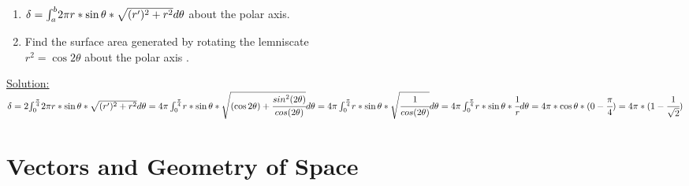 \noindent{\color{smalt(darkpowderblue)}\rule{\linewidth}{.2mm}}
\begin{example}
\begin{enumerate}
    \item $\delta={\Huge \int_{a}^{b}} {2\pi r*\sin{\theta}*\sqrt{(r')^2+r^2}d\theta}$ about the polar axis.
    \item Find the surface area generated by rotating the lemniscate\\ $r^2=\cos{2\theta}$ about the polar axis .
\end{enumerate}
{\color{smalt(darkpowderblue)}\underline {Solution:}}\\
$\delta=2{\Huge \int_{0}^{\frac{\pi}{4}}} {2\pi r*\sin{\theta}*\sqrt{(r')^2+r^2}d\theta}\\
={\Huge 4\pi \int_{0}^{\frac{\pi}{4}}} { r*\sin{\theta}*\sqrt{(\cos{2\theta})+\cfrac{sin^2(2\theta)}{cos(2\theta)}}d\theta}\\
={\Huge 4\pi \int_{0}^{\frac{\pi}{4}}} { r*\sin{\theta}*\sqrt{\cfrac{1}{cos(2\theta)}}d\theta}\\
={\Huge 4\pi \int_{0}^{\frac{\pi}{4}}} { r*\sin{\theta}*\cfrac{1}{r}d\theta}\\
=4\pi *\cos{\theta} *(0-\cfrac{\pi}{4})\\
=4\pi *(1-\cfrac{1}{\sqrt{2}})$
\end{example}
\setcounter{chapter}{11}
\chapter{Vectors and Geometry of Space}
